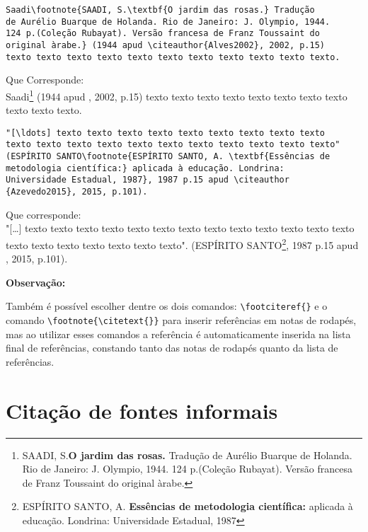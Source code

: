 \begin{alineas}
\item
\begin{verbatim}
Saadi\footnote{SAADI, S.\textbf{O jardim das rosas.} Tradução 
de Aurélio Buarque de Holanda. Rio de Janeiro: J. Olympio, 1944.
124 p.(Coleção Rubayat). Versão francesa de Franz Toussaint do 
original àrabe.} (1944 apud \citeauthor{Alves2002}, 2002, p.15) 
texto texto texto texto texto texto texto texto texto texto texto. 
\end{verbatim}
Que Corresponde: \\

Saadi\footnote{SAADI, S.\textbf{O jardim das rosas.} Tradução de Aurélio Buarque de Holanda. Rio de Janeiro: J. Olympio, 1944. 124 p.(Coleção Rubayat). Versão francesa de Franz Toussaint do original àrabe.} (1944 apud \citeauthor{Alves2002}, 2002, p.15) texto texto texto texto texto texto texto texto texto texto texto. 

\item
\begin{verbatim}
"[\ldots] texto texto texto texto texto texto texto texto texto 
texto texto texto texto texto texto texto texto texto texto texto"
(ESPÍRITO SANTO\footnote{ESPÍRITO SANTO, A. \textbf{Essências de
metodologia científica:} aplicada à educação. Londrina: 
Universidade Estadual, 1987}, 1987 p.15 apud \citeauthor
{Azevedo2015}, 2015, p.101).
\end{verbatim}
Que corresponde: \\
"[\ldots] texto texto texto texto texto texto texto texto texto texto texto texto texto texto texto texto texto texto texto texto". (ESPÍRITO SANTO\footnote{ESPÍRITO SANTO, A. \textbf{Essências de metodologia científica:} aplicada à educação. Londrina: Universidade Estadual, 1987}, 1987 p.15 apud \citeauthor
{Azevedo2015}, 2015, p.101).
\end{alineas}

\textbf{Observação:}

Também é possível escolher dentre os dois comandos: \verb+\footciteref{}+ e o comando \verb+\footnote{\citetext{}}+ para inserir referências em notas de rodapés, mas ao utilizar esses comandos a referência é automaticamente inserida na lista final de referências, constando tanto das notas de rodapés quanto da lista de referências.

\section{Citação de fontes informais}

